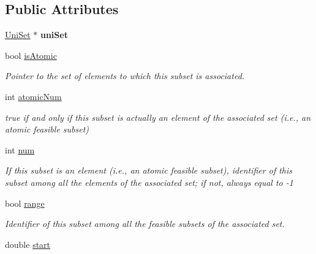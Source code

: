 \subsection*{Public Attributes}
\begin{DoxyCompactItemize}
\item 
\hypertarget{classUniSubset_a8e80f41fd95fe897ff04c813395c85d4}{\hyperlink{classUniSet}{Uni\-Set} $\ast$ {\bfseries uni\-Set}}\label{classUniSubset_a8e80f41fd95fe897ff04c813395c85d4}

\item 
\hypertarget{classUniSubset_a33f088ffb21e664508cfbfb75341513a}{bool \hyperlink{classUniSubset_a33f088ffb21e664508cfbfb75341513a}{is\-Atomic}}\label{classUniSubset_a33f088ffb21e664508cfbfb75341513a}

\begin{DoxyCompactList}\small\item\em Pointer to the set of elements to which this subset is associated. \end{DoxyCompactList}\item 
\hypertarget{classUniSubset_af111f69a265de0069e5705ce2c222f45}{int \hyperlink{classUniSubset_af111f69a265de0069e5705ce2c222f45}{atomic\-Num}}\label{classUniSubset_af111f69a265de0069e5705ce2c222f45}

\begin{DoxyCompactList}\small\item\em {\ttfamily true} if and only if this subset is actually an element of the associated set (i.\-e., an atomic feasible subset) \end{DoxyCompactList}\item 
\hypertarget{classUniSubset_a0b5a528a9edcc11061baff6ca4ce2657}{int \hyperlink{classUniSubset_a0b5a528a9edcc11061baff6ca4ce2657}{num}}\label{classUniSubset_a0b5a528a9edcc11061baff6ca4ce2657}

\begin{DoxyCompactList}\small\item\em If this subset is an element (i.\-e., an atomic feasible subset), identifier of this subset among all the elements of the associated set; if not, always equal to {\ttfamily -\/1} \end{DoxyCompactList}\item 
\hypertarget{classUniSubset_acc06eeeac6327c077a1aca2e7f6b02d7}{bool \hyperlink{classUniSubset_acc06eeeac6327c077a1aca2e7f6b02d7}{range}}\label{classUniSubset_acc06eeeac6327c077a1aca2e7f6b02d7}

\begin{DoxyCompactList}\small\item\em Identifier of this subset among all the feasible subsets of the associated set. \end{DoxyCompactList}\item 
\hypertarget{classUniSubset_af66bade84710d674e3e29b0ebfe16871}{double \hyperlink{classUniSubset_af66bade84710d674e3e29b0ebfe16871}{start}}\label{classUniSubset_af66bade84710d674e3e29b0ebfe16871}


\end{DoxyCompactItemize}
